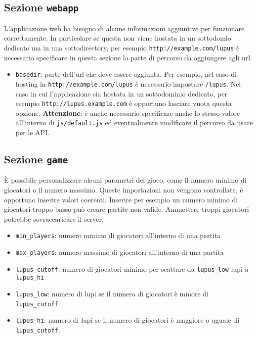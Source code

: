 \subsection{Sezione \texttt{webapp}}

L'applicazione web ha bisogno di alcune informazioni aggiuntive per funzionare correttamente. In particolare se questa non viene hostata in un sottodomio dedicato ma in una sottodirectory, per esempio \texttt{http://example.com/lupus} è necessario specificare in questa sezione la parte di percorso da aggiungere agli url.

\begin{itemize}[noitemsep,nolistsep]
	\item \texttt{basedir}: parte dell'url che deve essere aggiunta. Per esempio, nel caso di hosting in \texttt{http://example.com/lupus} è necessario impostare \texttt{/lupus}. Nel caso in cui l'applicazione sia hostata in un sottodominio dedicato, per esempio \texttt{http://lupus.example.com} è opportuno lasciare vuota questa opzione. \textbf{Attenzione}: è anche necessario specificare anche lo stesso valore all'interno di \texttt{js/default.js} ed eventualmente modificare il percorso da usare per le API.
\end{itemize}


\subsection{Sezione \texttt{game}}

È possibile personalizzare alcuni parametri del gioco, come il numero minimo di giocatori o il numero massimo. Queste impostazioni non vengono controllate, è opportuno inserire valori coerenti. Inserire per esempio un numero minimo di giocatori troppo basso può creare partite non valide. Ammettere troppi giocatori potrebbe sovraccaricare il server.

\begin{itemize}[noitemsep,nolistsep]
	\item \texttt{min\_players}: numero minimo di giocatori all'interno di una partita
	\item \texttt{max\_players}: numero massimo di giocatori all'interno di una partita
	\item \texttt{lupus\_cutoff}: numero di giocatori minimo per scattare da \texttt{lupus\_low} lupi a \texttt{lupus\_hi}
	\item \texttt{lupus\_low}: numero di lupi se il numero di giocatori è minore di \texttt{lupus\_cutoff}.
	\item \texttt{lupus\_hi}: numero di lupi se il numero di giocatori è maggiore o uguale di \texttt{lupus\_cutoff}.
\end{itemize}